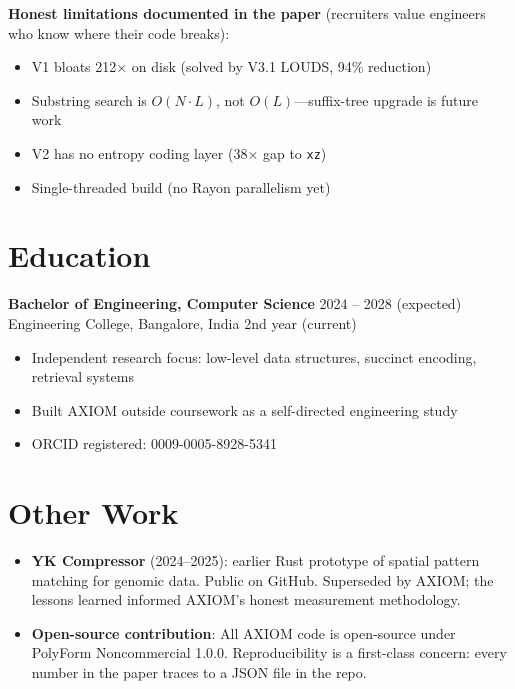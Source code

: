 \documentclass[11pt,a4paper]{article}
\begin{document}
\textbf{Honest limitations documented in the paper} (recruiters value engineers who know where their code breaks):
\begin{itemize}
\item V1 bloats 212$\times$ on disk (solved by V3.1 LOUDS, 94\% reduction)
\item Substring search is $O(N{\cdot}L)$, not $O(L)$---suffix-tree upgrade is future work
\item V2 has no entropy coding layer (38$\times$ gap to \texttt{xz})
\item Single-threaded build (no Rayon parallelism yet)
\end{itemize}

\section*{Education}

\textbf{Bachelor of Engineering, Computer Science} \hfill 2024 -- 2028 (expected)\\
Engineering College, Bangalore, India \hfill 2nd year (current)

\begin{itemize}
\item Independent research focus: low-level data structures, succinct encoding, retrieval systems
\item Built AXIOM outside coursework as a self-directed engineering study
\item ORCID registered: 0009-0005-8928-5341
\end{itemize}

\section*{Other Work}

\begin{itemize}
\item \textbf{YK Compressor} (2024--2025): earlier Rust prototype of spatial pattern matching for genomic data. Public on GitHub. Superseded by AXIOM; the lessons learned informed AXIOM's honest measurement methodology.

\item \textbf{Open-source contribution}: All AXIOM code is open-source under PolyForm Noncommercial 1.0.0. Reproducibility is a first-class concern: every number in the paper traces to a JSON file in the repo.
\end{itemize}
\end{document}
